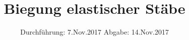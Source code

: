 

\subject{103}
\title{Biegung elastischer Stäbe}
\date{%
  Durchführung: 7.Nov.2017
  \hspace{3em}
  Abgabe: 14.Nov.2017
}



\maketitle
\thispagestyle{empty}
\tableofcontents
\newpage






\printbibliography{}


